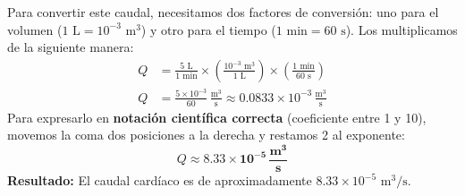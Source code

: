 \documentclass[12pt]{article}
\begin{document}
\begin{tcolorbox}
\begin{center}
\begin{tikzpicture}[scale=0.9]
    \end{tikzpicture}
    \end{center}

    \vspace{0.2cm}
    \begin{tcolorbox}[colback=medteal!10, colframe=medteal, arc=2mm, boxrule=1.2pt, title=\textbf{Desarrollo Matemático y Solución}]
        Para convertir este caudal, necesitamos dos factores de conversión: uno para el volumen ($1 \text{ L} = 10^{-3} \text{ m}^3$) y otro para el tiempo ($1 \text{ min} = 60 \text{ s}$). Los multiplicamos de la siguiente manera:
        \begin{align*}
            Q &= \frac{5 \text{ L}}{1 \text{ min}} \times \left( \frac{10^{-3} \text{ m}^3}{1 \text{ L}} \right) \times \left( \frac{1 \text{ min}}{60 \text{ s}} \right) \\[1.5ex]
            Q &= \frac{5 \times 10^{-3}}{60} \, \frac{\text{m}^3}{\text{s}} \approx 0.0833 \times 10^{-3} \, \frac{\text{m}^3}{\text{s}}
        \end{align*}
        Para expresarlo en \textbf{notación científica correcta} (coeficiente entre 1 y 10), movemos la coma dos posiciones a la derecha y restamos 2 al exponente:
        \[ Q \approx \mathbf{8.33 \times 10^{-5} \, \frac{\text{m}^3}{\text{s}}} \]
        \textbf{Resultado:} El caudal cardíaco es de aproximadamente \textbf{$8.33 \times 10^{-5} \text{ m}^3/\text{s}$}.
    \end{tcolorbox}
    
\end{tcolorbox}
\end{document}
